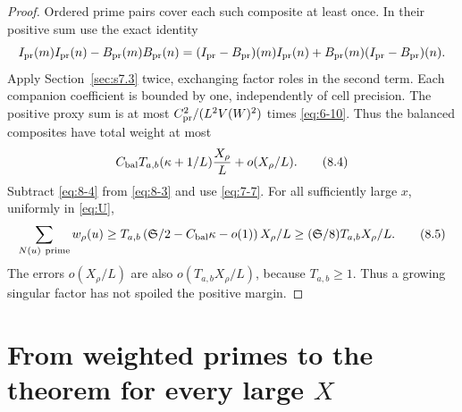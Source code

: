 \documentclass[11pt]{article}
\theoremstyle{definition}
\theoremstyle{definition}
\begin{document}
\begin{proof}
Ordered prime pairs cover each such composite at least once. In their positive sum use the exact identity
\begin{equation*}
I_{\rm pr}(m)I_{\rm pr}(n)-B_{\rm pr}(m)B_{\rm pr}(n)
 =(I_{\rm pr}-B_{\rm pr})(m)I_{\rm pr}(n)
  +B_{\rm pr}(m)(I_{\rm pr}-B_{\rm pr})(n).
\end{equation*}
Apply Section~\ref{sec:s7.3} twice, exchanging factor roles in the second term. Each companion coefficient is bounded by one, independently of cell precision. The positive proxy sum is at most \(C_{\rm pr}^2/(L^2V(W)^2)\) times \eqref{eq:6-10}. Thus the balanced composites have total weight at most
\begin{equation}
C_{\rm bal}T_{a,b}(\kappa+1/L)\frac{X_\rho}{L}
                                      +o(X_\rho/L).     \tag{8.4}\label{eq:8-4}
\end{equation}
Subtract \eqref{eq:8-4} from \eqref{eq:8-3} and use \eqref{eq:7-7}. For all sufficiently large \(x\), uniformly in \eqref{eq:U},
\begin{equation}
\sum_{N(u)\ {\rm prime}}w_\rho(u)
 \ge T_{a,b}\left(\mathfrak S/2-C_{\rm bal}\kappa-o(1)\right)
                 X_\rho/L
 \ge (\mathfrak S/8)T_{a,b}X_\rho/L.                    \tag{8.5}\label{eq:8-5}
\end{equation}
The errors \(o(X_\rho/L)\) are also \(o(T_{a,b}X_\rho/L)\), because \(T_{a,b}\ge1\). Thus a growing singular factor has not spoiled the positive margin.


\end{proof}

\section{From weighted primes to the theorem for every large \texorpdfstring{\(X\)}{X}}\label{sec:s9}
\end{document}
